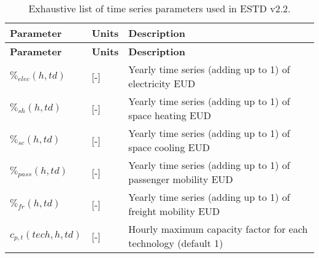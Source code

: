 \documentclass[
]{article}
\begin{document}
\begin{longtable}[]{@{}
  >{\raggedright\arraybackslash}p{}
  >{\raggedright\arraybackslash}p{}
  >{\raggedright\arraybackslash}p{}@{}}
\caption{Exhaustive list of time series parameters used in ESTD
v2.2.}\tabularnewline
\toprule\noalign{}
\begin{minipage}[b]{\linewidth}\raggedright
\textbf{Parameter}
\end{minipage} & \begin{minipage}[b]{\linewidth}\raggedright
\textbf{Units}
\end{minipage} & \begin{minipage}[b]{\linewidth}\raggedright
\textbf{Description}
\end{minipage} \\
\midrule\noalign{}
\endfirsthead
\toprule\noalign{}
\begin{minipage}[b]{\linewidth}\raggedright
\textbf{Parameter}
\end{minipage} & \begin{minipage}[b]{\linewidth}\raggedright
\textbf{Units}
\end{minipage} & \begin{minipage}[b]{\linewidth}\raggedright
\textbf{Description}
\end{minipage} \\
\midrule\noalign{}
\endhead
\bottomrule\noalign{}
\endlastfoot
\(\%_{elec}(h,td)\) & {[}-{]} & Yearly time series (adding up to 1) of
electricity EUD \\
\(\%_{sh}(h,td)\) & {[}-{]} & Yearly time series (adding up to 1) of
space heating EUD \\
\(\%_{sc}(h,td)\) & {[}-{]} & Yearly time series (adding up to 1) of
space cooling EUD \\
\(\%_{pass}(h,td)\) & {[}-{]} & Yearly time series (adding up to 1) of
passenger mobility EUD \\
\(\%_{fr}(h,td)\) & {[}-{]} & Yearly time series (adding up to 1) of
freight mobility EUD \\
\(c_{p,t}(tech,h,td)\) & {[}-{]} & Hourly maximum capacity factor for
each technology (default 1) \\
\end{longtable}
\end{document}
